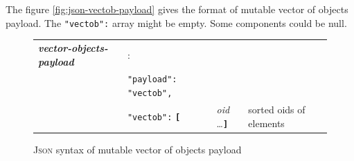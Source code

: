 \documentclass[11pt,a4paper,svgnames]{article}
\newcommand{\RefPerSys}{{\textit{\textsc{RefPerSys}}}}
\begin{document}
 The figure \ref{fig:json-vectob-payload} gives the format of mutable
 vector of objects payload. The \texttt{"vectob":} array might be
 empty. Some components could be null.

\begin{figure}[h]
  \begin {center}
    \begin{tabular}{llll}
      \emph{\textbf{vector-objects-payload}} & : & ~ & \\
      ~ & \texttt{"payload":} \texttt{"vectob"}\texttt{,} &  \\  
      ~ & \texttt{"vectob":} \textbf{\texttt{[}} &  \textit{oid} \ldots  \textbf{\texttt{]}} & sorted oids of elements \\ 
    \end{tabular}
  \end {center}
  \caption {\textsc{Json} syntax of mutable vector of objects payload}
\label{fig:json-vector-payload}  
\end{figure}

\end{document}
